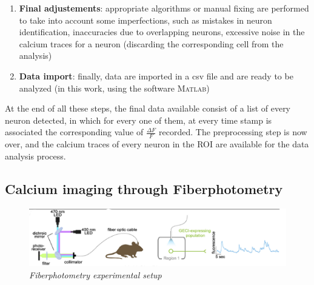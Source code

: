 \documentclass[a4paper]{article}
\begin{document}
\begin{enumerate}
	\item \textbf{Final adjustements}: appropriate algorithms or manual fixing are performed to take into account some imperfections, such as mistakes in neuron identification, inaccuracies due to overlapping neurons, excessive noise in the calcium traces for a neuron (discarding the corresponding cell from the analysis)
	
	\item \textbf{Data import}: finally, data are imported in a csv file and are ready to be analyzed (in this work, using the software \textsc{Matlab})
	
\end{enumerate} 


At the end of all these steps, the final data available consist of a list of every neuron detected, in which for every one of them, at every time stamp is associated the corresponding value of $\frac{\Delta F }{F}$ recorded. The preprocessing step is now over, and the calcium traces of every neuron in the ROI are available for the data analysis process.	


\newpage
\subsection{Calcium imaging through Fiberphotometry}

\begin{figure}[H]
	\begin{center}
		\includegraphics[scale=.50]{fiberphotometry.png} 
	\end{center} 
	\caption{\textit{Fiberphotometry experimental setup}}
	
\end{figure}
\end{document}
